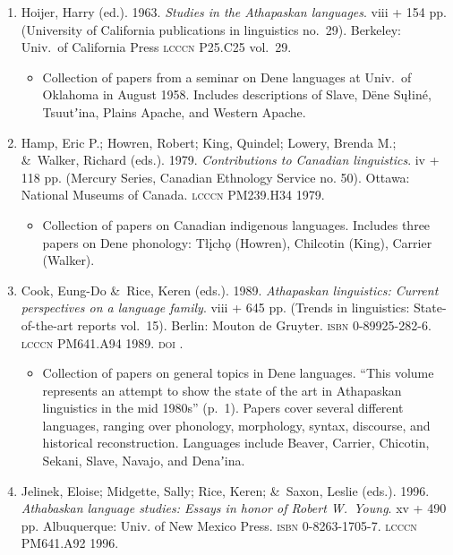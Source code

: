 \documentclass[12pt,letterpaper,oneside,article]{memoir}
\begin{document}
\begin{enumerate}
\item	Hoijer, Harry (ed.).
	1963.
	\textit{Studies in the Athapaskan languages}.
	viii + 154 pp.
	(University of California publications in linguistics no.\ 29).
	Berkeley: Univ.\ of California Press
	\textsc{lcccn} P25.C25 vol.\ 29.
	\begin{itemize}
	\item	Collection of papers from a seminar on Dene languages at Univ.\ of Oklahoma
		in August 1958.
		Includes descriptions of Slave, Dëne Sųłiné, Tsuutʼina, Plains Apache, and
		Western Apache.
	\end{itemize}
\item	Hamp, Eric P.; Howren, Robert; King, Quindel; Lowery, Brenda M.; \&\ Walker, Richard (eds.).
	1979.
	\textit{Contributions to Canadian linguistics}.
	iv + 118 pp.
	(Mercury Series, Canadian Ethnology Service no. 50).
	Ottawa: National Museums of Canada.
	\textsc{lcccn} PM239.H34 1979.
	\begin{itemize}
	\item	Collection of papers on Canadian indigenous languages.
		Includes three papers on Dene phonology: Tłįchǫ (Howren),
		Chilcotin (King), Carrier (Walker).
	\end{itemize}
\item	Cook, Eung-Do \&\ Rice, Keren (eds.).
	1989.
	\textit{Athapaskan linguistics: Current perspectives on a language family}.
	viii + 645 pp.
	(Trends in linguistics: State-of-the-art reports vol.\ 15).
	Berlin: Mouton de Gruyter.
	\textsc{isbn} 0-89925-282-6.
	\textsc{lcccn} PM641.A94 1989.
	\textsc{doi} .
	\begin{itemize}
	\item	Collection of papers on general topics in Dene languages.
		“This volume represents an attempt to show the state of the art in
		Athapaskan linguistics in the mid 1980s” (p.\ 1).
		Papers cover several different languages, ranging over phonology,
		morphology, syntax, discourse, and historical reconstruction.
		Languages include Beaver, Carrier, Chicotin, Sekani, Slave, Navajo,
		and Denaʼina. 
	\end{itemize}
\item	Jelinek, Eloise; Midgette, Sally; Rice, Keren; \&\ Saxon, Leslie (eds.).
	1996.
	\textit{Athabaskan language studies: Essays in honor of Robert W.\ Young}.
	xv + 490 pp.
	Albuquerque: Univ. of New Mexico Press.
	\textsc{isbn} 0-8263-1705-7.
	\textsc{lcccn} PM641.A92 1996.
	\begin{itemize}

\end{itemize}
\end{enumerate}
\end{document}
